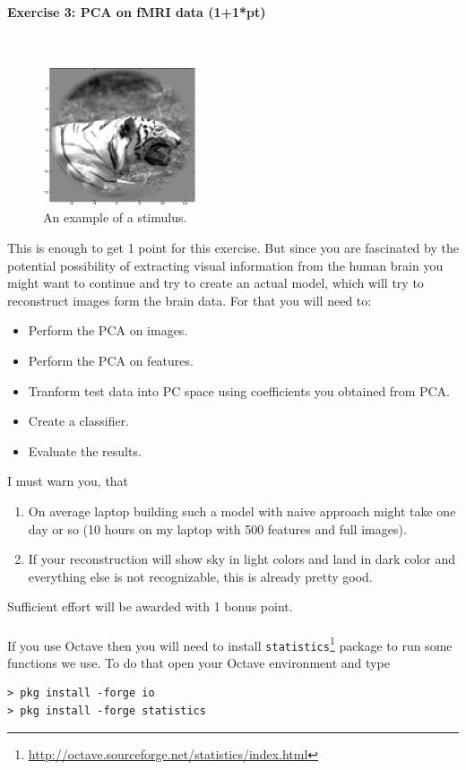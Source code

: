 \documentclass[a4paper,11pt]{article}
\newenvironment{exercise}[3]{\paragraph{Exercise #1: #2 (#3pt)}\ \\}{
\medskip}
\begin{document}
\begin{exercise}{3}{PCA on fMRI data}{1+1*}
\begin{figure}[H]
   \centering
   \includegraphics[width=0.4\textwidth]{examplepic.png} 
   \caption{An example of a stimulus.}
   \label{fig:examplepic}
\end{figure}

This is enough to get 1 point for this exercise. But since you are fascinated by the potential possibility of extracting visual information from the human brain you might want to continue and try to create an actual model, which will try to reconstruct images form the brain data. For that you will need to:
\begin{itemize}
\itemsep 0em
	\item Perform the PCA on images.
	\item Perform the PCA on features.
	\item Tranform test data into PC space using coefficients you obtained from PCA.
	\item Create a classifier.
	\item Evaluate the results.
\end{itemize}
I must warn you, that 
\begin{enumerate}
\itemsep 0em
	\item On average laptop building such a model with naive approach might take one day or so (10 hours on my laptop with 500 features and full images).
	\item If your reconstruction will show sky in light colors and land in dark color and everything else is not recognizable, this is already pretty good.
\end{enumerate}
Sufficient effort will be awarded with 1 bonus point.\\
\ \\
If you use Octave then you will need to install \texttt{statistics}\footnote{\url{http://octave.sourceforge.net/statistics/index.html}} package to run some functions we use. To do that open your Octave environment and type
\begin{verbatim}
> pkg install -forge io
> pkg install -forge statistics
\end{verbatim}




\end{exercise}
\end{document}
